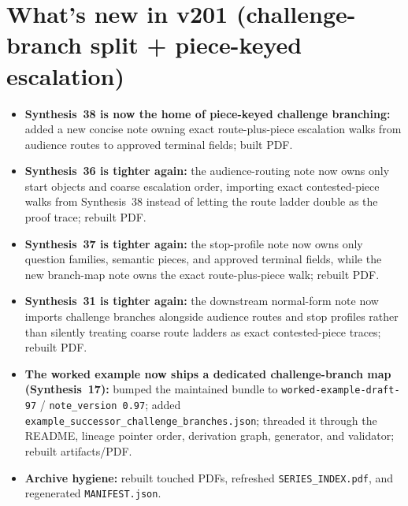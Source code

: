 \documentclass[11pt]{article}
\begin{document}
\section{What's new in v201 (challenge-branch split + piece-keyed escalation)}
\begin{itemize}[leftmargin=*]
\item \textbf{Synthesis~38 is now the home of piece-keyed challenge branching:} added a new concise note owning exact route-plus-piece escalation walks from audience routes to approved terminal fields; built PDF.
\item \textbf{Synthesis~36 is tighter again:} the audience-routing note now owns only start objects and coarse escalation order, importing exact contested-piece walks from Synthesis~38 instead of letting the route ladder double as the proof trace; rebuilt PDF.
\item \textbf{Synthesis~37 is tighter again:} the stop-profile note now owns only question families, semantic pieces, and approved terminal fields, while the new branch-map note owns the exact route-plus-piece walk; rebuilt PDF.
\item \textbf{Synthesis~31 is tighter again:} the downstream normal-form note now imports challenge branches alongside audience routes and stop profiles rather than silently treating coarse route ladders as exact contested-piece traces; rebuilt PDF.
\item \textbf{The worked example now ships a dedicated challenge-branch map (Synthesis~17):} bumped the maintained bundle to \texttt{worked-example-draft-97} / \texttt{note\_version 0.97}; added \texttt{example\_successor\_challenge\_branches.json}; threaded it through the README, lineage pointer order, derivation graph, generator, and validator; rebuilt artifacts/PDF.
\item \textbf{Archive hygiene:} rebuilt touched PDFs, refreshed \texttt{SERIES\_INDEX.pdf}, and regenerated \texttt{MANIFEST.json}.
\end{itemize}
\end{document}
